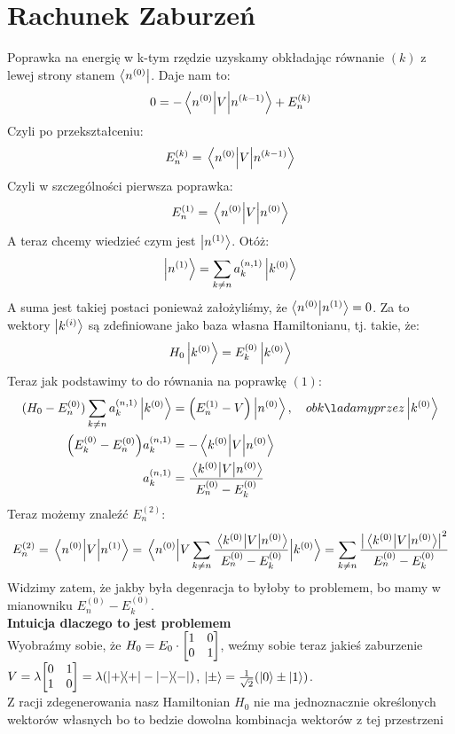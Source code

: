 \documentclass[12pt,a4paper]{report}
\renewcommand{\emph}{\textbf}
\newenvironment{lecture}[1]{\par\medskip
   \noindent\chapter{#1} \rmfamily}{\medskip}
\begin{document}
\begin{lecture}{Rachunek Zaburzeń}
    Poprawka na energię w k-tym rzędzie uzyskamy obkładając równanie $(k)$ z lewej strony stanem $\bra{n^{(0)}}$. Daje nam to:
    \[
      0 = - \mel{n^{(0)}}{V}{n^{(k-1)}} + E_n^{(k)}  
    \] 
    Czyli po przekształceniu:
    \[
      E_n^{(k)} = \mel{n^{(0)}}{V}{n^{(k-1)}}
    \]
    Czyli w szczególności pierwsza poprawka:
    \[
        E_n^{(1)} = \mel{n^{(0)}}{V}{n^{(0)}}  
    \]
    A teraz chcemy wiedzieć czym jest $\ket{n^{(1)}}$. Otóż:
    \[
        \ket{n^{(1)}} = \sum_{k\neq n} a_k^{(n,1)} \ket{k^{(0)}}
    \]
    A suma jest takiej postaci ponieważ założyliśmy, że $\braket{n^{(0)}}{n^{(1)}} = 0$. Za to wektory $\ket{k^{(i)}}$ są zdefiniowane jako baza własna Hamiltonianu, tj. takie, że:
    \[
         H_0 \ket{k^{(0)}} = E_k^{(0)} \ket{k^{(0)}}  
    \]
    Teraz jak podstawimy to do równania na poprawkę $(1)$:
    \begin{align*}
        (H_0 - E_n^{(0)}) \sum_{k \neq n} a_k^{(n, 1)} \ket{k^{(0)}} &= \qty(E_n^{(1)} - V) \ket{n^{(0)}} \qc{obkładamy przez }\ket{k^{(0)}}\\
        \qty(E_k^{(0)} - E_n^{(0)}) a_k^{(n, 1)} &= -\mel{k^{(0)}}{V}{n^{(0)}}\\
        a_k^{(n, 1)} &= \frac{\mel{k^{(0)}}{V}{n^{(0)}}}{E_n^{(0)} - E_k^{(0)}}
    \end{align*}
    Teraz możemy znaleźć $E_n^{(2)}$:
    \[
        E_n^{(2)} = \mel{n^{(0)}}{V}{n^{(1)}} = \mel{n^{(0)}}{V \sum_{k \neq n} \frac{\mel{k^{(0)}}{V}{n^{(0)}}}{E_n^{(0)} - E_k^{(0)}}}{k^{(0)}} = \sum_{k \neq n} \frac{\abs{\mel{k^{(0)}}{V}{n^{(0)}}}^2}{E_n^{(0)} - E_k^{(0)}}  
    \]
    Widzimy zatem, że jakby była degenracja to byłoby to problemem, bo mamy w mianowniku $E_n^{(0)} - E_k^{(0)}$.\\
    \emph{Intuicja dlaczego to jest problemem}\\
    Wyobraźmy sobie, że $H_0  = E_0 \cdot \mqty[1 & 0 \\ 0 & 1]$, weźmy sobie teraz jakieś zaburzenie $V = \lambda \mqty[0 & 1 \\ 1 & 0] = \lambda\qty(\ketbra{+} - \ketbra{-})$, 
    $\ket{\pm} = \frac{1}{\sqrt{2}} \qty(\ket{0} \pm \ket{1})$.\\
    Z racji zdegenerowania nasz Hamiltonian $H_0$ nie ma jednoznacznie określonych wektorów własnych bo to bedzie dowolna kombinacja wektorów z tej przestrzeni 
\end{lecture}

\end{document}

